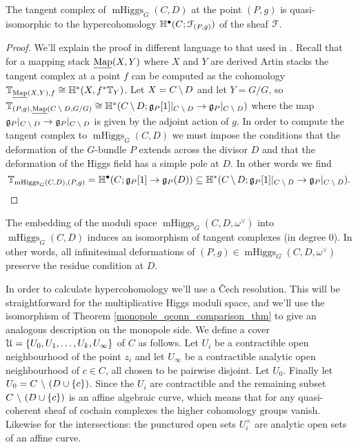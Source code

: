 \documentclass[10pt, oneside]{article}
\DeclareMathOperator{\mhiggs}{mHiggs}
\newcommand{\map}{\ul{\mr{Map}}}
\begin{document}
\begin{prop}
The tangent complex of $\mhiggs_G(C, D)$ at the point $(P,g)$ is quasi-isomorphic to the hypercohomology $\mathbb{H}^\bullet(C; \mathcal{F}_{(P,g)})$ of the sheaf $\mathcal{F}$.
\end{prop}

\begin{proof}
We'll explain the proof in different language to that used in \cite{Bottacin}.  Recall that for a mapping stack $\map(X,Y)$ where $X$ and $Y$ are derived Artin stacks the tangent complex at a point $f$ can be computed as the cohomology $\bb T_{\map(X,Y),f} \iso \bb H^*(X, f^*\bb T_Y)$.  Let $X = C \!\ \backslash \ \! D$ and let $Y = G/G$, so $\bb T_{(P,g), \map(C \!\bs\! D, G/G)} \iso \bb H^*(C \!\bs\! D; \gg_P[1]|_{C \!\bs\! D} \to \gg_P|_{C \!\bs\! D})$ where the map $\mathfrak{g}_P|_{C \!\ \backslash \ \! D} \to \mathfrak{g}_P|_{C \!\ \backslash \ \! D}$ is given by the adjoint action of $g$.  In order to compute the tangent complex to $\mhiggs_G(C,D)$ we must impose the conditions that the deformation of the $G$-bundle $P$ extends across the divisor $D$ and that the deformation of the Higgs field has a simple pole at $D$.  In other words we find
\[ \bb T_{\mhiggs_G(C,D), (P,g)} = \bb H^\bullet(C; \gg_P[1] \to \gg_P(D)) \sub \bb H^*(C \!\bs\! D; \gg_P[1]|_{C \!\bs\! D} \to \gg_P|_{C \!\bs\! D}).\]
\end{proof}

\begin{remark}
The embedding of the moduli space $\mhiggs_G(C, D,\omega^\vee)$ into $\mhiggs_G(C, D)$ induces an isomorphism of tangent complexes (in degree 0).  In other words, all infinitesimal deformations of $(P,g) \in \mhiggs_G(C, D,\omega^\vee)$ preserve the residue condition at $D$.
\end{remark}

In order to calculate hypercohomology we'll use a \v Cech resolution.  This will be straightforward for the multiplicative Higgs moduli space, and we'll use the isomorphism of Theorem \ref{monopole_qconn_comparison_thm} to give an analogous description on the monopole side.    We define a cover $\mathcal{U} = \{U_0, U_1, \ldots, U_k, U_\infty\}$ of $C$ as follows.  Let $U_i$ be a contractible open neighbourhood of the point $z_i$ and let $U_\infty$ be a contractible analytic open neighbourhood of $c \in C$, all chosen to be pairwise disjoint.  Let $U_0$.  Finally let $U_0 = C \ \backslash \  (D \cup \{c\})$.  Since the $U_i$ are contractible and the remaining subset $C \ \backslash \  (D \cup \{c\})$ is an affine algebraic curve, which means that for any quasi-coherent sheaf of cochain complexes the higher cohomology groups vanish.  Likewise for the intersections: the punctured open sets $U_i^\times$ are analytic open sets of an affine curve.  
\end{document}
